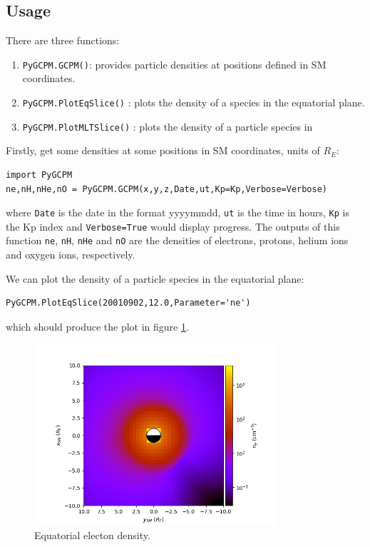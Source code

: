 		\subsection{Usage}

			There are three functions:
			\begin{enumerate}
				\item \texttt{PyGCPM.GCPM()}: provides particle densities at positions defined in SM coordinates.
				\item \texttt{PyGCPM.PlotEqSlice()} : plots the density of a species in the equatorial plane.
				\item \texttt{PyGCPM.PlotMLTSlice()} : plots the density of a particle species in 
			\end{enumerate}

			Firstly, get some densities at some positions in SM coordinates, units of $R_E$:
			\begin{verbatim}
import PyGCPM
ne,nH,nHe,nO = PyGCPM.GCPM(x,y,z,Date,ut,Kp=Kp,Verbose=Verbose)
			\end{verbatim}
			where \texttt{Date} is the date in the format yyyymmdd, \texttt{ut} is the time in hours, \texttt{Kp} is the Kp index and \texttt{Verbose=True} would display progress. The outputs of this function \texttt{ne}, \texttt{nH}, \texttt{nHe} and \texttt{nO} are the densities of electrons, protons, helium ions and oxygen ions, respectively.

			We can plot the density of a particle species in the equatorial plane:
			\begin{verbatim}
PyGCPM.PlotEqSlice(20010902,12.0,Parameter='ne')
			\end{verbatim}
			which should produce the plot in figure \ref{FigPyGCPMEq}.

			\begin{figure}
				\begin{center}
					\includegraphics[width=0.8\textwidth]{figures/ch2_pygcpm_equator.png}
				\end{center}
				\caption{Equatorial electon density. \label{FigPyGCPMEq}}
			\end{figure}

